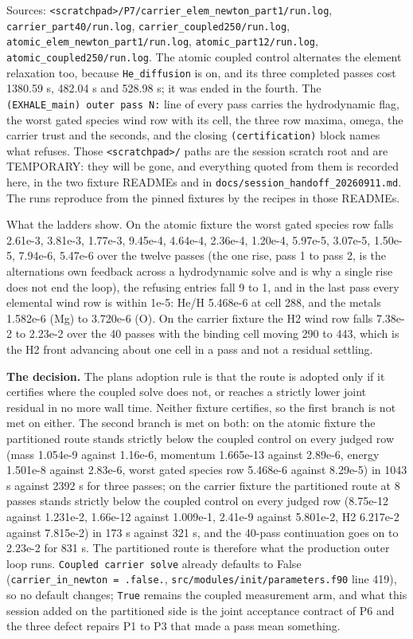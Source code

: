 \documentclass[english,a4paper]{my_memo}
\begin{document}
Sources: \texttt{\textless{}scratchpad\textgreater{}/P7/carrier\_elem\_newton\_part1/run.log},
\texttt{carrier\_part40/run.log}, \texttt{carrier\_coupled250/run.log},
\texttt{atomic\_elem\_newton\_part1/run.log}, \texttt{atomic\_part12/run.log},
\texttt{atomic\_coupled250/run.log}. The atomic coupled control alternates the
element relaxation too, because \texttt{He\_diffusion} is on, and its three completed
passes cost 1380.59 s, 482.04 s and 528.98 s; it was ended in the fourth. The
\texttt{(EXHALE\_main)\ outer\ pass\ N:} line of every pass carries the hydrodynamic
flag, the worst gated species wind row with its cell, the three row maxima,
omega, the carrier trust and the seconds, and the closing \texttt{(certification)}
block names what refuses. Those \texttt{\textless{}scratchpad\textgreater{}/} paths are the session scratch
root and are TEMPORARY: they will be gone, and everything quoted from them is
recorded here, in the two fixture READMEs and in
\texttt{docs/session\_handoff\_20260911.md}. The runs reproduce from the pinned
fixtures by the recipes in those READMEs.

What the ladders show. On the atomic fixture the worst gated species row
falls 2.61e-3, 3.81e-3, 1.77e-3, 9.45e-4, 4.64e-4, 2.36e-4, 1.20e-4,
5.97e-5, 3.07e-5, 1.50e-5, 7.94e-6, 5.47e-6 over the twelve passes (the one
rise, pass 1 to pass 2, is the alternation\textquotesingle s own feedback across a
hydrodynamic solve and is why a single rise does not end the loop), the
refusing entries fall 9 to 1, and in the last pass every elemental wind row
is within 1e-5: He/H 5.468e-6 at cell 288, and the metals 1.582e-6 (Mg) to
3.720e-6 (O). On the carrier fixture the H2 wind row falls 7.38e-2 to
2.23e-2 over the 40 passes with the binding cell moving 290 to 443, which is
the H2 front advancing about one cell in a pass and not a residual settling.

\textbf{The decision.} The plan\textquotesingle s adoption rule is that the route is adopted only
if it certifies where the coupled solve does not, or reaches a strictly lower
joint residual in no more wall time. Neither fixture certifies, so the first
branch is not met on either. The second branch is met on both: on the atomic
fixture the partitioned route stands strictly below the coupled control on
every judged row (mass 1.054e-9 against 1.16e-6, momentum 1.665e-13 against
2.89e-6, energy 1.501e-8 against 2.83e-6, worst gated species row 5.468e-6
against 8.29e-5) in 1043 s against 2392 s for three passes; on the carrier
fixture the partitioned route at 8 passes stands strictly below the coupled
control on every judged row (8.75e-12 against 1.231e-2, 1.66e-12 against
1.009e-1, 2.41e-9 against 5.801e-2, H2 6.217e-2 against 7.815e-2) in 173 s
against 321 s, and the 40-pass continuation goes on to 2.23e-2 for 831 s.
The partitioned route is therefore what the production outer loop runs.
\texttt{Coupled\ carrier\ solve} already defaults to False
(\texttt{carrier\_in\_newton\ =\ .false.}, \texttt{src/modules/init/parameters.f90} line 419),
so no default changes; \texttt{True} remains the coupled measurement arm, and what
this session added on the partitioned side is the joint acceptance contract
of P6 and the three defect repairs P1 to P3 that made a pass mean something.
\end{document}

